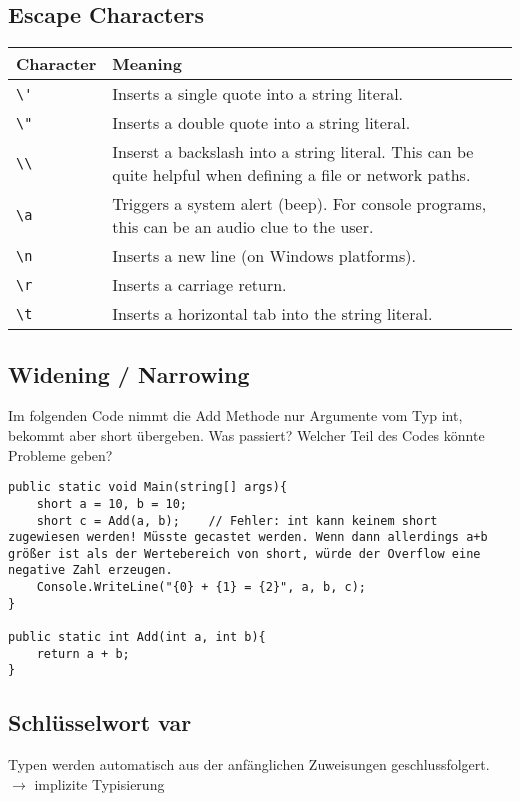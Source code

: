 \subsection{Escape Characters}
\begin{otherlanguage}{english}
\begin{longtable}{L{.2} L{.7}}
Character & Meaning \\\hline
\lstinline$\'$ & Inserts a single quote into a string literal.\\
\lstinline$\"$ & Inserts a double quote into a string literal.\\
\lstinline$\\$ & Inserst a backslash into a string literal. This can be quite helpful when defining a file or network paths.\\
\lstinline$\a$ & Triggers a system alert (beep). For console programs, this can be an audio clue to the user.\\
\lstinline$\n$ & Inserts a new line (on Windows platforms).\\
\lstinline$\r$ & Inserts a carriage return.\\
\lstinline$\t$ & Inserts a horizontal tab into the string literal.
\end{longtable}
\end{otherlanguage}

\subsection{Widening / Narrowing}

Im folgenden Code nimmt die Add Methode nur Argumente vom Typ int, bekommt aber short übergeben. Was passiert? Welcher Teil des Codes könnte Probleme geben?
\begin{lstlisting}[language={[Sharp]C}]
public static void Main(string[] args){
	short a = 10, b = 10;	
	short c = Add(a, b);	// Fehler: int kann keinem short zugewiesen werden! Müsste gecastet werden. Wenn dann allerdings a+b größer ist als der Wertebereich von short, würde der Overflow eine negative Zahl erzeugen.
	Console.WriteLine("{0} + {1} = {2}", a, b, c);
}

public static int Add(int a, int b){
	return a + b;
}
\end{lstlisting}

\subsection{Schlüsselwort var}
Typen werden automatisch aus der anfänglichen Zuweisungen geschlussfolgert.\\
$\to$ implizite Typisierung

